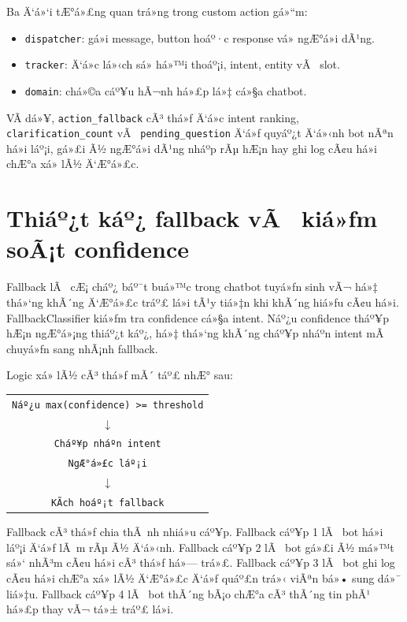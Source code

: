 ﻿\documentclass[12pt,a4paper]{report}
\begin{document}
Ba Ä‘á»‘i tÆ°á»£ng quan trá»ng trong custom action gá»“m:

\begin{itemize}
    \item \texttt{dispatcher}: gá»­i message, button hoáº·c response vá» ngÆ°á»i dÃ¹ng.
    \item \texttt{tracker}: Ä‘á»c lá»‹ch sá»­ há»™i thoáº¡i, intent, entity vÃ  slot.
    \item \texttt{domain}: chá»©a cáº¥u hÃ¬nh há»£p lá»‡ cá»§a chatbot.
\end{itemize}

VÃ­ dá»¥, \texttt{action\_fallback} cÃ³ thá»ƒ Ä‘á»c intent ranking, \texttt{clarification\_count} vÃ  \texttt{pending\_question} Ä‘á»ƒ quyáº¿t Ä‘á»‹nh bot nÃªn há»i láº¡i, gá»£i Ã½ ngÆ°á»i dÃ¹ng nháº­p rÃµ hÆ¡n hay ghi log cÃ¢u há»i chÆ°a xá»­ lÃ½ Ä‘Æ°á»£c.




\section{Thiáº¿t káº¿ fallback vÃ  kiá»ƒm soÃ¡t confidence}

Fallback lÃ  cÆ¡ cháº¿ báº¯t buá»™c trong chatbot tuyá»ƒn sinh vÃ¬ há»‡ thá»‘ng khÃ´ng Ä‘Æ°á»£c tráº£ lá»i tÃ¹y tiá»‡n khi khÃ´ng hiá»ƒu cÃ¢u há»i. FallbackClassifier kiá»ƒm tra confidence cá»§a intent. Náº¿u confidence tháº¥p hÆ¡n ngÆ°á»¡ng thiáº¿t káº¿, há»‡ thá»‘ng khÃ´ng cháº¥p nháº­n intent mÃ  chuyá»ƒn sang nhÃ¡nh fallback.

Logic xá»­ lÃ½ cÃ³ thá»ƒ mÃ´ táº£ nhÆ° sau:

\begin{center}
\begin{tabular}{c}
\texttt{Náº¿u max(confidence) >= threshold} \\
$\downarrow$ \\
\texttt{Cháº¥p nháº­n intent} \\
\texttt{NgÆ°á»£c láº¡i} \\
$\downarrow$ \\
\texttt{KÃ­ch hoáº¡t fallback}
\end{tabular}
\end{center}

Fallback cÃ³ thá»ƒ chia thÃ nh nhiá»u cáº¥p. Fallback cáº¥p 1 lÃ  bot há»i láº¡i Ä‘á»ƒ lÃ m rÃµ Ã½ Ä‘á»‹nh. Fallback cáº¥p 2 lÃ  bot gá»£i Ã½ má»™t sá»‘ nhÃ³m cÃ¢u há»i cÃ³ thá»ƒ há»— trá»£. Fallback cáº¥p 3 lÃ  bot ghi log cÃ¢u há»i chÆ°a xá»­ lÃ½ Ä‘Æ°á»£c Ä‘á»ƒ quáº£n trá»‹ viÃªn bá»• sung dá»¯ liá»‡u. Fallback cáº¥p 4 lÃ  bot thÃ´ng bÃ¡o chÆ°a cÃ³ thÃ´ng tin phÃ¹ há»£p thay vÃ¬ tá»± tráº£ lá»i.
\end{document}
